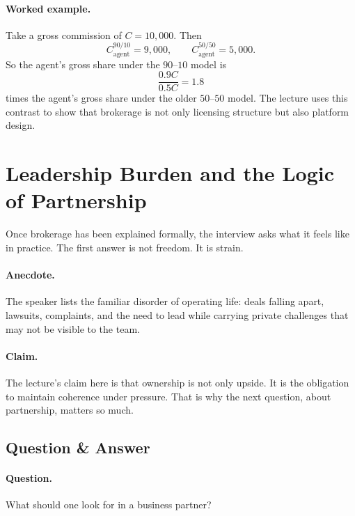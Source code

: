 \paragraph{Worked example.}
Take a gross commission of \(C=10{,}000\). Then
\begin{equation}
C_{\mathrm{agent}}^{90/10}=9{,}000,
\qquad
C_{\mathrm{agent}}^{50/50}=5{,}000.
\end{equation}
So the agent's gross share under the \(90\text{--}10\) model is
\begin{equation}
\frac{0.9C}{0.5C}=1.8
\end{equation}
times the agent's gross share under the older \(50\text{--}50\) model. The lecture uses this contrast to show that brokerage is not only licensing structure but also platform design.

\section{Leadership Burden and the Logic of Partnership}

Once brokerage has been explained formally, the interview asks what it feels like in practice. The first answer is not freedom. It is strain.

\paragraph{Anecdote.}
The speaker lists the familiar disorder of operating life: deals falling apart, lawsuits, complaints, and the need to lead while carrying private challenges that may not be visible to the team.

\paragraph{Claim.}
The lecture's claim here is that ownership is not only upside. It is the obligation to maintain coherence under pressure. That is why the next question, about partnership, matters so much.

\subsection{Question \& Answer}

\paragraph{Question.}
What should one look for in a business partner?

